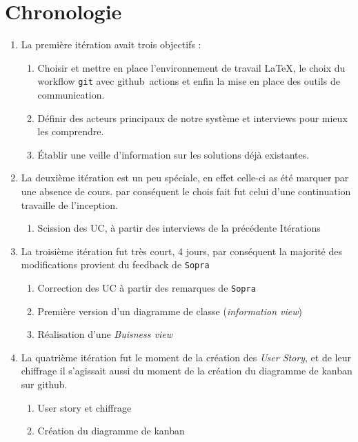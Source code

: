\documentclass[a4paper,french,final]{memoir}
\begin{document}
\section{Chronologie}
\begin{enumerate}[label=\textbf{Itération~n\kern-0.5bp\textsuperscript{o}~\arabic*:},start=0]
    
    \item La première itération avait trois objectifs :
    \begin{enumerate}
        \item [\ding{51}]Choisir et mettre en place l'environnement de travail \LaTeX, le choix du workflow \texttt{git} avec github~actions et enfin la mise en place des outils de communication.
        \item [\ding{51}]Définir des acteurs principaux de notre système et interviews pour mieux les comprendre.
        \item [\ding{51}]Établir une veille d'information sur les solutions déjà existantes.
    \end{enumerate}
    
    \item La deuxième itération est un peu spéciale, en effet celle-ci as été marquer par une absence de cours.
    par conséquent le chois fait fut celui d'une continuation travaille de l'inception.
    \begin{enumerate}
        \item [\ding{51}]Scission des UC, à partir des interviews de la précédente Itérations
    \end{enumerate}
    
    \item La troisième itération fut très court, 4 jours, par conséquent la majorité des modifications provient du feedback de \texttt{Sopra}
    \begin{enumerate}
        \item []Correction des UC à partir des remarques de \texttt{Sopra}
        \item [\ding{51}]Première version d'un diagramme de classe (\emph{information view})
        \item [\ding{51}] Réalisation d'une \emph{Buisness view}
    \end{enumerate}

    \item La quatrième itération fut le moment de la création des \textit{User Story}, et de leur chiffrage
    il s'agissait aussi du moment de la création du diagramme de kanban sur github.
    \begin{enumerate}
        \item [\ding{51}] User story et chiffrage
        \item [\ding{51}] Création du diagramme de kanban
    \end{enumerate}


\end{enumerate}
\end{document}
